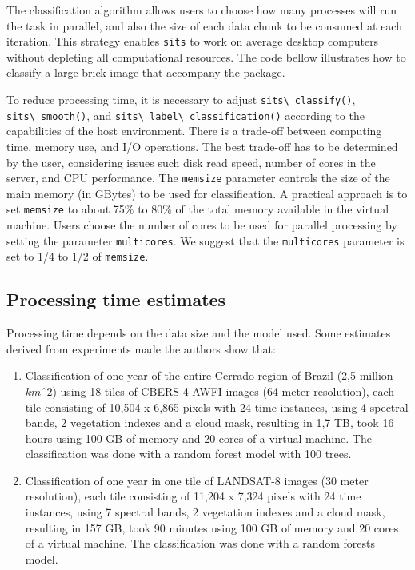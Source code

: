 \documentclass[
  11pt,
]{report}
\newcommand{\passthrough}[1]{#1}
\begin{document}
The classification algorithm allows users to choose how many processes
will run the task in parallel, and also the size of each data chunk to
be consumed at each iteration. This strategy enables
\passthrough{\lstinline!sits!} to work on average desktop computers
without depleting all computational resources. The code bellow
illustrates how to classify a large brick image that accompany the
package.

To reduce processing time, it is necessary to adjust
\passthrough{\lstinline!sits\_classify()!},
\passthrough{\lstinline!sits\_smooth()!}, and
\passthrough{\lstinline!sits\_label\_classification()!} according to the
capabilities of the host environment. There is a trade-off between
computing time, memory use, and I/O operations. The best trade-off has
to be determined by the user, considering issues such disk read speed,
number of cores in the server, and CPU performance. The
\passthrough{\lstinline!memsize!} parameter controls the size of the
main memory (in GBytes) to be used for classification. A practical
approach is to set \passthrough{\lstinline!memsize!} to about 75\% to
80\% of the total memory available in the virtual machine. Users choose
the number of cores to be used for parallel processing by setting the
parameter \passthrough{\lstinline!multicores!}. We suggest that the
\passthrough{\lstinline!multicores!} parameter is set to 1/4 to 1/2 of
\passthrough{\lstinline!memsize!}.

\hypertarget{processing-time-estimates}{%
\subsection*{Processing time
estimates}\label{processing-time-estimates}}

Processing time depends on the data size and the model used. Some
estimates derived from experiments made the authors show that:

\begin{enumerate}
\def\labelenumi{\arabic{enumi}.}
\item
  Classification of one year of the entire Cerrado region of Brazil (2,5
  million \(kmˆ2\)) using 18 tiles of CBERS-4 AWFI images (64 meter
  resolution), each tile consisting of 10,504 x 6,865 pixels with 24
  time instances, using 4 spectral bands, 2 vegetation indexes and a
  cloud mask, resulting in 1,7 TB, took 16 hours using 100 GB of memory
  and 20 cores of a virtual machine. The classification was done with a
  random forest model with 100 trees.
\item
  Classification of one year in one tile of LANDSAT-8 images (30 meter
  resolution), each tile consisting of 11,204 x 7,324 pixels with 24
  time instances, using 7 spectral bands, 2 vegetation indexes and a
  cloud mask, resulting in 157 GB, took 90 minutes using 100 GB of
  memory and 20 cores of a virtual machine. The classification was done
  with a random forests model.
\end{enumerate}
\end{document}
